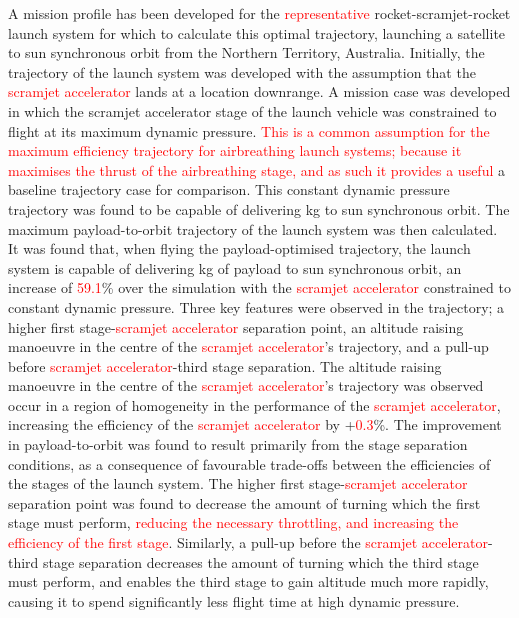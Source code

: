 A mission profile has been developed for the \textcolor{red}{representative} rocket-scramjet-rocket launch system for which to calculate this optimal trajectory, launching a satellite to sun synchronous orbit from the Northern Territory, Australia. 
Initially, the trajectory of the launch system was developed with the assumption that the \textcolor{red}{scramjet accelerator} lands at a location downrange.
A mission case was developed in which the scramjet accelerator stage of the launch vehicle was constrained to flight at its maximum dynamic pressure. \textcolor{red}{This is a common assumption for the maximum efficiency trajectory for airbreathing launch systems; because it maximises the thrust of the airbreathing stage, and as such it provides a useful} a baseline trajectory case for comparison. This constant dynamic pressure trajectory was found to be capable of delivering \PayloadToOrbitConstqNoReturn kg to sun synchronous orbit. 
The maximum payload-to-orbit trajectory of the launch system was then calculated. It was found that, when flying the payload-optimised trajectory, the launch system is capable of delivering \PayloadToOrbitStandardNoReturn kg of payload to sun synchronous orbit, an increase of \textcolor{red}{59.1}\% over the simulation with the \textcolor{red}{scramjet accelerator} constrained to constant dynamic pressure. 
Three key features were observed in the trajectory; a higher first stage-\textcolor{red}{scramjet accelerator} separation point, an altitude raising manoeuvre in the centre of the \textcolor{red}{scramjet accelerator}'s trajectory, and a pull-up before \textcolor{red}{scramjet accelerator}-third stage separation.
The altitude raising manoeuvre in the centre of the \textcolor{red}{scramjet accelerator}'s trajectory was observed occur in a region of homogeneity in the performance of the \textcolor{red}{scramjet accelerator}, increasing the efficiency of the \textcolor{red}{scramjet accelerator} by +\textcolor{red}{0.3}\%. 
The improvement in payload-to-orbit was found to result primarily from the stage separation conditions, as a consequence of favourable trade-offs between the efficiencies of the stages of the launch system.
The higher first stage-\textcolor{red}{scramjet accelerator} separation point was found to decrease the amount of turning which the first stage must perform,
 \textcolor{red}{reducing the necessary throttling, and increasing the efficiency of the first stage}. 
 Similarly, a pull-up before the \textcolor{red}{scramjet accelerator}-third stage separation decreases the amount of turning which the third stage must perform, and enables the third stage to gain altitude much more rapidly, causing it to spend significantly less flight time at high dynamic pressure. 
